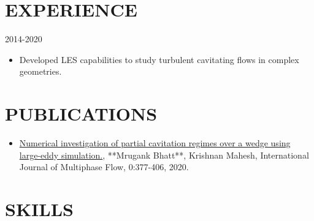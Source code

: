 \documentclass{res}
\begin{document}
\begin{resume}
	
	
	\section{\MakeUppercase{Experience}} \vskip 0.15in
	
	\hspace*{-0.25in}{\bf Research Assistant} \hfill 2014-2020 \\
	\hspace*{-0.25in}{\it University of Minnesota, Minnesota, MN}
	\begin{itemize}[leftmargin=\parindent]
	\setlength{\itemsep}{0mm} \smallskip
	
		\item Developed LES capabilities to study turbulent cavitating flows in complex geometries.
	\end{itemize}
	
	
	
	
		
	
	
	
	\section{\MakeUppercase{Publications}} \vskip 0.35in
	\begin{itemize}[leftmargin=\parindent]
	\setlength{\itemsep}{4pt}
	
	\item[] \href{https://dept.aem.umn.edu/~kmahesh/globalassets/publpdf/journal/mrugank_ijmf19.pdf}{Numerical investigation of partial cavitation regimes over a wedge using large-eddy simulation.}, **Mrugank Bhatt**, Krishnan Mahesh, International Journal of Multiphase Flow, 0:377-406, 2020.
	\end{itemize}
	
	
	
		
	
	\section{\MakeUppercase{Skills}} \vskip 0.35in
	\begin{itemize}[leftmargin=\parindent]
	\setlength{\itemsep}{0mm}
	

\end{itemize}
\end{resume}
\end{document}

